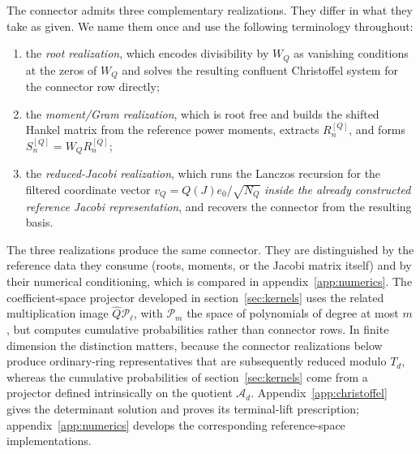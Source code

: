 \documentclass[a4paper,11pt]{article}
\def\Jac{J}%
\theoremstyle{definition}
\theoremstyle{remark}
\newcommand{\cA}{\mathcal A}
\newcommand{\cP}{\mathcal P}
\newcommand{\Jac}{\mathsf J}
\newcommand{\Qhat}{\widehat Q}
\begin{document}
The connector admits three complementary realizations. They differ in what they take as
given.  We name them once and use the following terminology throughout:
\begin{enumerate}[label=(\roman*),leftmargin=2.4em,itemsep=1pt]
\item the \emph{root realization}, which encodes divisibility by $W_Q$ as vanishing conditions at the zeros of $W_Q$ and
      solves the resulting confluent Christoffel system for the connector row directly;
\item the \emph{moment/Gram realization}, which is root free and builds the shifted Hankel matrix
      from the reference power moments, extracts $R_n^{[Q]}$, and forms
      $S_n^{[Q]}=W_QR_n^{[Q]}$;
\item the \emph{reduced-Jacobi realization}, which runs the Lanczos recursion for the filtered
      coordinate vector $v_Q=Q(\Jac)e_0/\sqrt{N_Q}$ \emph{inside the already constructed reference
      Jacobi representation}, and recovers the connector from the resulting basis.
\end{enumerate}
The three realizations produce the same connector. They are distinguished by the reference data they consume (roots, moments, or the Jacobi matrix itself) and by their numerical conditioning, which is
compared in appendix~\ref{app:numerics}.
The coefficient-space projector developed in section~\ref{sec:kernels} uses the related multiplication image $\Qhat\cP_\ell$, with $\cP_m$ the space of polynomials of degree at most $m$, but computes cumulative probabilities rather than connector rows. In finite dimension the distinction matters, because the connector realizations below produce ordinary-ring representatives that are subsequently reduced modulo $T_d$, whereas the cumulative probabilities of section~\ref{sec:kernels} come from a projector defined intrinsically on the quotient $\cA_d$. Appendix~\ref{app:christoffel} gives the determinant solution and proves its terminal-lift prescription; appendix~\ref{app:numerics} develops the corresponding reference-space implementations.
\end{document}
